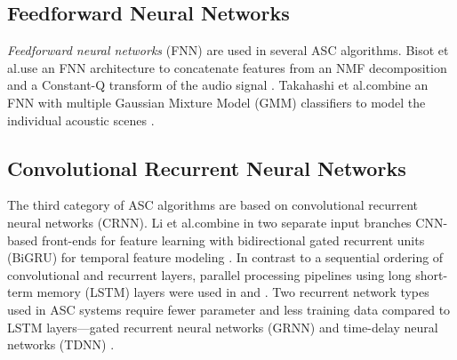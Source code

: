 \documentclass[applsci,article,submit,oneauthor,pdftex]{Definitions/mdpi}
\makeatletter
\newcommand{\etal}{{et al}.\@ }
\makeatother
\begin{document}
\subsection{Feedforward Neural Networks}
\label{sec:fnn}

\textit{Feedforward neural networks} (FNN) are used in several ASC algorithms. Bisot \etal use an FNN architecture to concatenate features from an NMF decomposition and a Constant-Q transform of the audio signal \citep{Bisot:2017:NFASC:DCASE}. Takahashi \etal combine an FNN with multiple Gaussian Mixture Model (GMM) classifiers to model the individual acoustic scenes \citep{Takahashi:2017:ASC:APSIPA}.

\subsection{Convolutional Recurrent Neural Networks}
\label{sec:crnn}
The third category of ASC algorithms are based on convolutional recurrent neural networks (CRNN).
Li \etal combine in two separate input branches CNN-based front-ends for feature learning with bidirectional gated recurrent units (BiGRU) for temporal feature modeling  \citep{Li:2019:MultilevelAttention:ICMEW}.
In contrast to a sequential ordering of convolutional and recurrent layers, parallel processing pipelines using long short-term memory (LSTM) layers were used in \citep{Mun:2017:ASC:ICASSP} and \citep{Bae:2016:LSTMCNN:DCASE}.
Two recurrent network types used in ASC systems require fewer parameter and less training data compared to LSTM layers---gated recurrent neural networks (GRNN)  \citep{Zoehrer:2016:GRN_ASC:DCASE, Qian:2017:WaveletASC:DCASE, Ren:2017:DeepSequentialASC:DCASE} and time-delay neural networks (TDNN) \citep{Moritz:2016:TDNN:DCASE, Jati:2020:ASC:ICASSP}.


\end{document}
